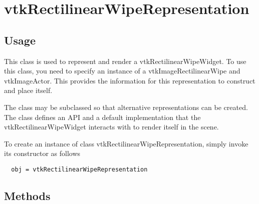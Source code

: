 \section{vtkRectilinearWipeRepresentation}

\subsection{Usage}

 This class is used to represent and render a vtkRectilinearWipeWidget. To
 use this class, you need to specify an instance of a
 vtkImageRectilinearWipe and vtkImageActor. This provides the information
 for this representation to construct and place itself.

 The class may be subclassed so that alternative representations can
 be created.  The class defines an API and a default implementation that
 the vtkRectilinearWipeWidget interacts with to render itself in the scene.

To create an instance of class vtkRectilinearWipeRepresentation, simply
invoke its constructor as follows
\begin{verbatim}
  obj = vtkRectilinearWipeRepresentation
\end{verbatim}
\subsection{Methods}

